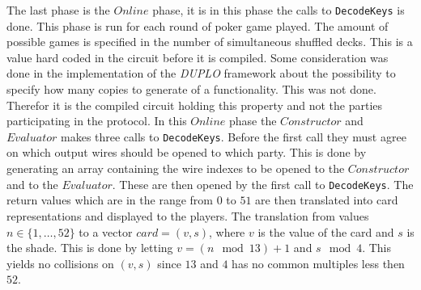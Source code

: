 \documentclass[twoside,11pt,openright]{report}
\newcommand{\DUPLO}{\textit{DUPLO} }
\begin{document}
The last phase is the $Online$ phase, it is in this phase the calls to \verb|DecodeKeys| is done. This phase is run for each round of poker game played. The amount of possible games is specified in the number of simultaneous shuffled decks. This is a value hard coded in the circuit before it is compiled. Some consideration was done in the implementation of the \DUPLO framework about the possibility to specify how many copies to generate of a functionality. This was not done. Therefor it is the compiled circuit holding this property and not the parties participating in the protocol. In this $Online$ phase the $Constructor$ and $Evaluator$ makes three calls to \verb|DecodeKeys|. Before the first call they must agree on which output wires should be opened to which party. This is done by generating an array containing the wire indexes to be opened to the $Constructor$ and to the $Evaluator$. These are then opened by the first call to \verb|DecodeKeys|. The return values which are in the range from $0$ to $51$ are then translated into card representations and displayed to the players. The translation from values $n\in \{1,\dots,52\}$ to a vector $card=(v,s)$, where $v$ is the value of the card and $s$ is the shade. This is done by letting $v=(n \mod 13)+1$ and $s \mod 4$. This yields no collisions on $(v,s)$ since $13$ and $4$ has no common multiples less then $52$.
\end{document}
